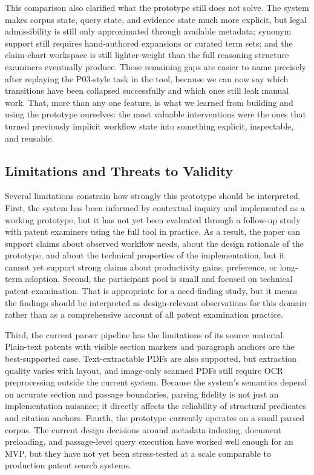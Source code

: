 \documentclass[sigconf]{acmart}
\begin{document}
This comparison also clarified what the prototype still does not solve. The
system makes corpus state, query state, and evidence state much more explicit,
but legal admissibility is still only approximated through available metadata;
synonym support still requires hand-authored expansions or curated term sets;
and the claim-chart workspace is still lighter-weight than the full reasoning
structure examiners eventually produce. Those remaining gaps are easier to name
precisely after replaying the P03-style task in the tool, because we can now
say which transitions have been collapsed successfully and which ones still leak
manual work. That, more than any one feature, is what we learned from building
and using the prototype ourselves: the most valuable interventions were the ones
that turned previously implicit workflow state into something explicit,
inspectable, and reusable.

\subsection{Limitations and Threats to Validity}

Several limitations constrain how strongly this prototype should be interpreted.
First, the system has been informed by contextual inquiry and implemented as a
working prototype, but it has not yet been evaluated through a follow-up study
with patent examiners using the full tool in practice. As a result, the paper
can support claims about observed workflow needs, about the design rationale of
the prototype, and about the technical properties of the implementation, but it
cannot yet support strong claims about productivity gains, preference, or
long-term adoption. Second, the participant pool is small and focused on
technical patent examination. That is appropriate for a need-finding study, but
it means the findings should be interpreted as design-relevant observations for
this domain rather than as a comprehensive account of all patent examination
practice.

Third, the current parser pipeline has the limitations of its source material.
Plain-text patents with visible section markers and paragraph anchors are the
best-supported case. Text-extractable PDFs are also supported, but extraction
quality varies with layout, and image-only scanned PDFs still require OCR
preprocessing outside the current system. Because the system's semantics depend
on accurate section and passage boundaries, parsing fidelity is not just an
implementation nuisance; it directly affects the reliability of structural
predicates and citation anchors. Fourth, the prototype currently operates on a
small parsed corpus. The current design decisions around metadata indexing,
document preloading, and passage-level query execution have worked well enough
for an MVP, but they have not yet been stress-tested at a scale comparable to
production patent search systems.
\end{document}
